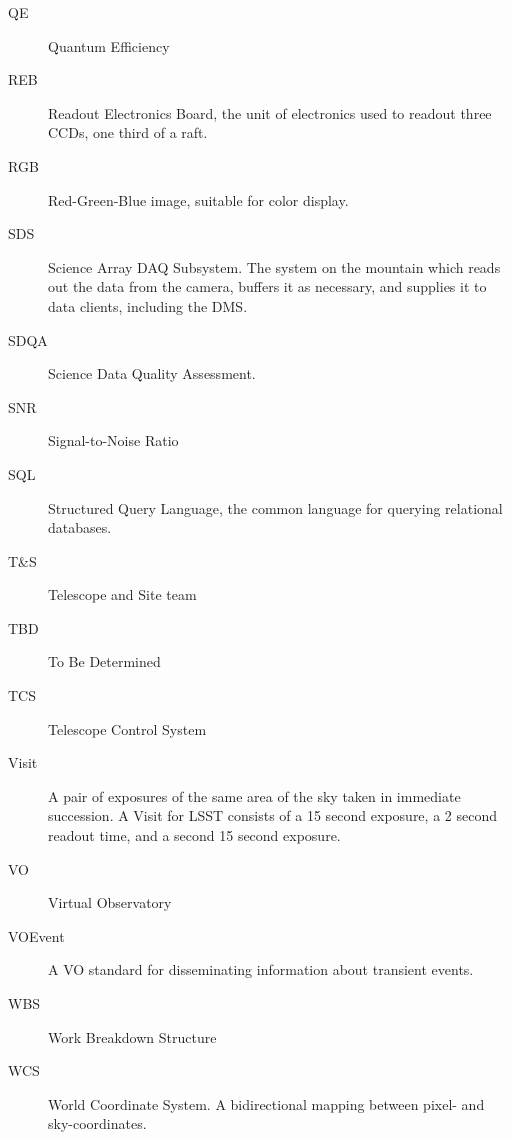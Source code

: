 \documentclass[DM,toc,lsstdraft]{lsstdoc}
\begin{document}
\begin{description}
\item[QE] Quantum Efficiency
\item[REB] Readout Electronics Board, the unit of electronics used to readout three CCDs, \ie one third of a raft.
\item[RGB] Red-Green-Blue image, suitable for color display.
\item[SDS] Science Array DAQ Subsystem.  The system on the mountain which reads
out the data from the camera, buffers it as necessary, and supplies it
to data clients, including the DMS.
\item[SDQA] Science Data Quality Assessment.
\item[SNR] Signal-to-Noise Ratio
\item[SQL] Structured Query Language, the common language for querying relational databases.
\item[T\&S] Telescope and Site team
\item[TBD] To Be Determined
\item[TCS] Telescope Control System
\item[Visit] A pair of exposures of the same area of the sky taken in immediate
succession.  A Visit for LSST consists of a 15 second exposure, a 2
second readout time, and a second 15 second exposure.
\item[VO] Virtual Observatory
\item[VOEvent] A VO standard for disseminating information about transient events.
\item [WBS] Work Breakdown Structure
\item[WCS] World Coordinate System.  A bidirectional mapping between pixel- and sky-coordinates.
\end{description}

\clearpage


\end{document}
